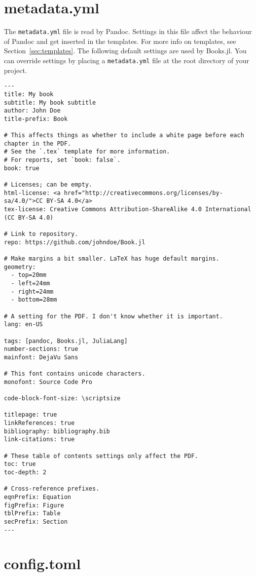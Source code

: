 \documentclass[
  14pt
  american,
  paper=a4,
  ,captions=tableheading
]{scrreprt}
\newcommand{\passthrough}[1]{#1}
\begin{document}
\hypertarget{sec:metadata}{%
\section{metadata.yml}\label{sec:metadata}}

The \passthrough{\lstinline!metadata.yml!} file is read by Pandoc.
Settings in this file affect the behaviour of Pandoc and get inserted in
the templates. For more info on templates, see
Section~\ref{sec:templates}. The following default settings are used by
Books.jl. You can override settings by placing a
\passthrough{\lstinline!metadata.yml!} file at the root directory of
your project.

\begin{lstlisting}
---
title: My book
subtitle: My book subtitle
author: John Doe
title-prefix: Book

# This affects things as whether to include a white page before each chapter in the PDF.
# See the `.tex` template for more information.
# For reports, set `book: false`.
book: true

# Licenses; can be empty.
html-license: <a href="http://creativecommons.org/licenses/by-sa/4.0/">CC BY-SA 4.0</a>
tex-license: Creative Commons Attribution-ShareAlike 4.0 International (CC BY-SA 4.0)

# Link to repository.
repo: https://github.com/johndoe/Book.jl

# Make margins a bit smaller. LaTeX has huge default margins.
geometry:
  - top=20mm
  - left=24mm
  - right=24mm
  - bottom=28mm

# A setting for the PDF. I don't know whether it is important.
lang: en-US

tags: [pandoc, Books.jl, JuliaLang]
number-sections: true
mainfont: DejaVu Sans

# This font contains unicode characters.
monofont: Source Code Pro

code-block-font-size: \scriptsize

titlepage: true
linkReferences: true
bibliography: bibliography.bib
link-citations: true

# These table of contents settings only affect the PDF.
toc: true
toc-depth: 2

# Cross-reference prefixes.
eqnPrefix: Equation
figPrefix: Figure
tblPrefix: Table
secPrefix: Section
---
\end{lstlisting}

\hypertarget{sec:config}{%
\section{config.toml}\label{sec:config}}
\end{document}
